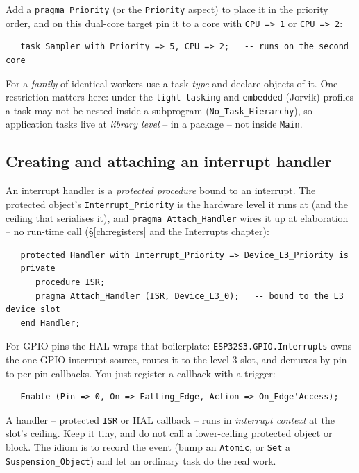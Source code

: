Add a \texttt{pragma Priority} (or the \texttt{Priority} aspect) to place it in
the priority order, and on this dual-core target pin it to a core with
\texttt{CPU => 1} or \texttt{CPU => 2}:

\begin{lstlisting}
   task Sampler with Priority => 5, CPU => 2;   -- runs on the second core
\end{lstlisting}

For a \emph{family} of identical workers use a task \emph{type} and declare
objects of it. One restriction matters here: under the \texttt{light-tasking} and
\texttt{embedded} (Jorvik) profiles a task may not be nested inside a subprogram
(\texttt{No\_Task\_Hierarchy}), so application tasks live at \emph{library level}
-- in a package -- not inside \texttt{Main}.

\subsection{Creating and attaching an interrupt handler}

An interrupt handler is a \emph{protected procedure} bound to an interrupt. The
protected object's \texttt{Interrupt\_Priority} is the hardware level it runs at
(and the ceiling that serialises it), and \texttt{pragma Attach\_Handler} wires
it up at elaboration -- no run-time call (\S\ref{ch:registers} and the Interrupts
chapter):

\begin{lstlisting}
   protected Handler with Interrupt_Priority => Device_L3_Priority is
   private
      procedure ISR;
      pragma Attach_Handler (ISR, Device_L3_0);   -- bound to the L3 device slot
   end Handler;
\end{lstlisting}

For GPIO pins the HAL wraps that boilerplate: \texttt{ESP32S3.GPIO.Interrupts}
owns the one GPIO interrupt source, routes it to the level-3 slot, and demuxes by
pin to per-pin callbacks. You just register a callback with a trigger:

\begin{lstlisting}
   Enable (Pin => 0, On => Falling_Edge, Action => On_Edge'Access);
\end{lstlisting}

A handler -- protected \texttt{ISR} or HAL callback -- runs in \emph{interrupt
context} at the slot's ceiling. Keep it tiny, and do not call a lower-ceiling
protected object or block. The idiom is to record the event (bump an
\texttt{Atomic}, or \texttt{Set} a \texttt{Suspension\_Object}) and let an
ordinary task do the real work.

